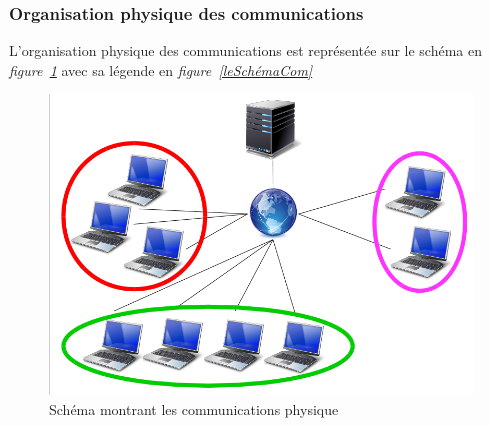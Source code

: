 \documentclass[a4paper,11pt]{report}
\begin{document}
\subsubsection{Organisation physique des communications}

L’organisation physique des communications est représentée sur le schéma en \textit{figure~\ref{schémaCom}} avec sa légende en \textit{figure~\ref{leSchémaCom}}
  
  \begin{figure}[th]
      \begin{center}
        \includegraphics[scale=0.3]{Assets/s_r_1.png}
        \caption{Schéma montrant les communications physique}
        \label{schémaCom}
      \end{center}
    \end{figure}
\end{document}
